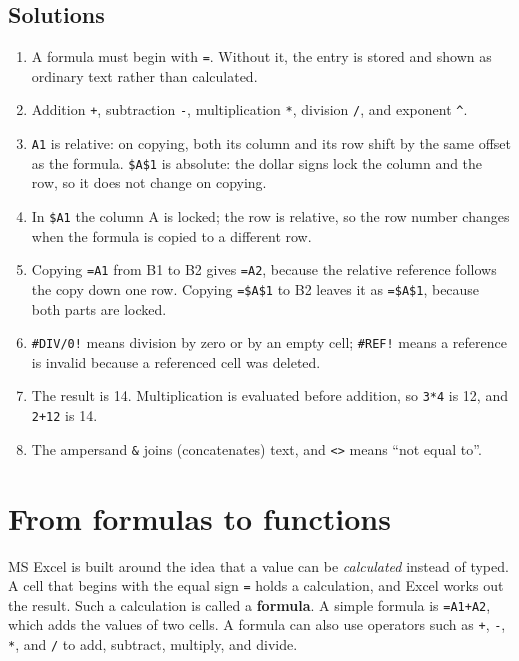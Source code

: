 \subsection*{Solutions}
\begingroup\small
\begin{enumerate}[label=\arabic*.]
  \item A formula must begin with \texttt{=}. Without it, the entry is stored
    and shown as ordinary text rather than calculated.
  \item Addition \texttt{+}, subtraction \texttt{-}, multiplication
    \texttt{*}, division \texttt{/}, and exponent \texttt{\textasciicircum}.
  \item \texttt{A1} is relative: on copying, both its column and its row shift
    by the same offset as the formula. \texttt{\$A\$1} is absolute: the dollar
    signs lock the column and the row, so it does not change on copying.
  \item In \texttt{\$A1} the column A is locked; the row is relative, so the
    row number changes when the formula is copied to a different row.
  \item Copying \texttt{=A1} from B1 to B2 gives \texttt{=A2}, because the
    relative reference follows the copy down one row. Copying \texttt{=\$A\$1}
    to B2 leaves it as \texttt{=\$A\$1}, because both parts are locked.
  \item \texttt{\#DIV/0!} means division by zero or by an empty cell;
    \texttt{\#REF!} means a reference is invalid because a referenced cell was
    deleted.
  \item The result is 14. Multiplication is evaluated before addition, so
    \texttt{3*4} is 12, and \texttt{2+12} is 14.
  \item The ampersand \texttt{\&} joins (concatenates) text, and \texttt{<>}
    means ``not equal to''.
\end{enumerate}
\endgroup

\section{From formulas to functions}
MS Excel is built around the idea that a value can be \emph{calculated}
instead of typed. A cell that begins with the equal sign \texttt{=} holds a
calculation, and Excel works out the result. Such a calculation is called a
\textbf{formula}. A simple formula is \texttt{=A1+A2}, which adds the values
of two cells. A formula can also use operators such as \texttt{+}, \texttt{-},
\texttt{*}, and \texttt{/} to add, subtract, multiply, and divide.

